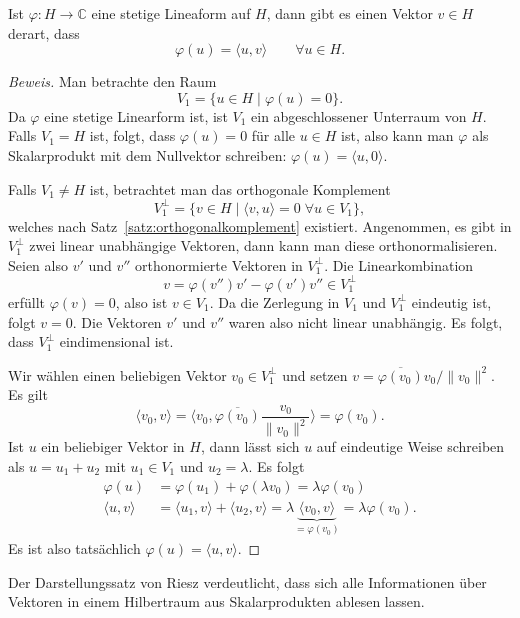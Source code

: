 \begin{satz}[Riesz]
\label{geometrie:satz:riesz}
Ist $\varphi\colon H\to \mathbb C$ eine stetige Lineaform auf $H$, dann 
gibt es einen Vektor $v\in H$ derart, dass
\[
\varphi(u) = \langle u,v\rangle
\qquad
\forall u\in H.
\]
\end{satz}

\begin{proof}[Beweis]
Man betrachte den Raum
\[
V_1 = \{ u \in H \;|\;\varphi(u)=0\}.
\]
Da $\varphi$ eine stetige Linearform ist, ist $V_1$ ein abgeschlossener
Unterraum von $H$.
Falls $V_1=H$ ist, folgt, dass $\varphi(u)=0$ für alle $u\in H$ ist,
also kann man $\varphi$ als Skalarprodukt mit dem Nullvektor schreiben:
$\varphi(u) = \langle u,0\rangle$.

Falls $V_1 \ne H$ ist, betrachtet man das orthogonale Komplement
\[
V_1^{\perp} = \{ v\in H\;|\; \langle v,u\rangle = 0\; \forall u\in V_1\},
\]
welches nach Satz~\ref{satz:orthogonalkomplement} existiert.
Angenommen, es gibt in $V_1^\perp$ zwei linear unabhängige Vektoren,
dann kann man diese orthonormalisieren.
Seien also $v'$ und $v''$ orthonormierte Vektoren in $V_1^\perp$.
Die Linearkombination
\[
v
=
\varphi(v'') v' - \varphi(v') v''
\in
V_1^\perp
\]
erfüllt $\varphi(v) = 0$, also ist $v\in V_1$.
Da die Zerlegung in $V_1$ und $V_1^\perp$ eindeutig ist, folgt
$v=0$.
Die Vektoren $v'$ und $v''$ waren also nicht linear unabhängig.
Es folgt, dass $V_1^\perp$ eindimensional ist.

Wir wählen einen beliebigen Vektor $v_0\in V_1^\perp$ und
setzen $v = \overline{\varphi(v_0)}v_0/\|v_0\|^2$.
Es gilt 
\[
\langle v_0,v\rangle
=
\biggl\langle v_0,
\overline{\varphi(v_0)}\frac{v_0}{\|v_0\|^2}
\biggr\rangle
=
\varphi(v_0).
\]
Ist $u$ ein beliebiger Vektor in $H$, dann lässt sich $u$ auf eindeutige
Weise schreiben als $u=u_1+u_2$ mit $u_1\in V_1$ und $u_2=\lambda $.
Es folgt
\begin{align*}
\varphi(u)
&=
\varphi(u_1) + \varphi(\lambda v_0)
=
\lambda \varphi(v_0)
\\
\langle u,v\rangle
&=
\langle u_1,v\rangle + \langle u_2,v\rangle
=
\lambda \underbrace{\langle v_0,v\rangle}_{\displaystyle=\varphi(v_0)}
=
\lambda \varphi(v_0).
\end{align*}
Es ist also tatsächlich $\varphi(u)=\langle u,v\rangle$.
\end{proof}

Der Darstellungssatz von Riesz verdeutlicht, dass sich alle Informationen über
Vektoren in einem Hilbertraum aus Skalarprodukten ablesen lassen.
